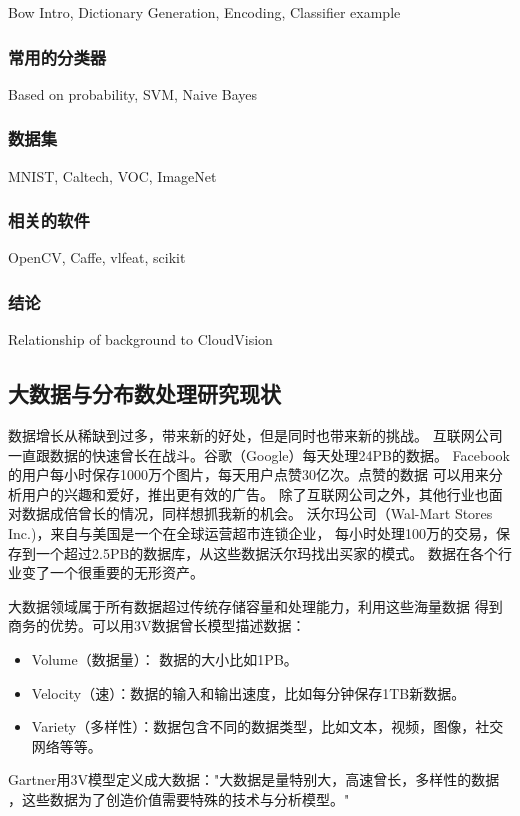 Bow Intro, Dictionary Generation, Encoding, Classifier example

\subsubsection{常用的分类器}
\label{subsubsec:classifier}
Based on probability, SVM, Naive Bayes

\subsubsection{数据集}

MNIST, Caltech, VOC, ImageNet

\subsubsection{相关的软件}
OpenCV, Caffe, vlfeat, scikit


\subsubsection{结论}
Relationship of background to CloudVision

\subsection{大数据与分布数处理研究现状}
\label{subsec:bigdata_background}
数据增长从稀缺到过多，带来新的好处，但是同时也带来新的挑战。
互联网公司一直跟数据的快速曾长在战斗。谷歌（Google）每天处理24PB的数据。
Facebook的用户每小时保存1000万个图片，每天用户点赞30亿次。点赞的数据
可以用来分析用户的兴趣和爱好，推出更有效的广告。
除了互联网公司之外，其他行业也面对数据成倍曾长的情况，同样想抓我新的机会。
沃尔玛公司（Wal-Mart Stores Inc.)，来自与美国是一个在全球运营超市连锁企业，
每小时处理100万的交易，保存到一个超过2.5PB的数据库，从这些数据沃尔玛找出买家的模式。
数据在各个行业变了一个很重要的无形资产。\cite{mayer2013bigdata}

大数据领域属于所有数据超过传统存储容量和处理能力，利用这些海量数据
得到商务的优势。可以用3V数据曾长模型描述数据：
\begin{itemize}
  \item Volume（数据量）： 数据的大小比如1PB。
  \item Velocity（速）：数据的输入和输出速度，比如每分钟保存1TB新数据。
  \item Variety（多样性）：数据包含不同的数据类型，比如文本，视频，图像，社交网络等等。
\end{itemize}
Gartner用3V模型定义成大数据："大数据是量特别大，高速曾长，多样性的数据
，这些数据为了创造价值需要特殊的技术与分析模型。"\cite{bigdatadefinition}

